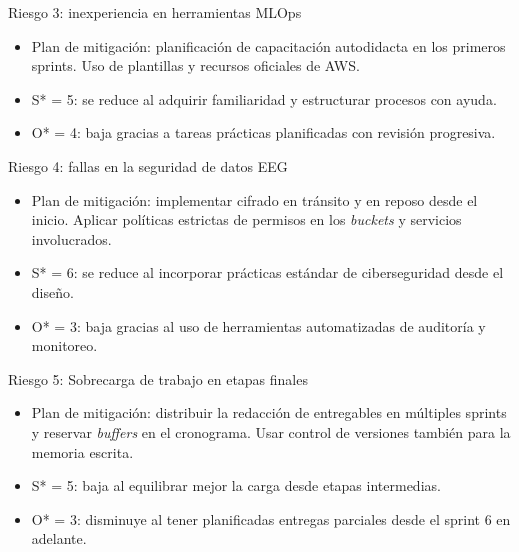 \documentclass[
11pt, %
]{charter}
\begin{document}
Riesgo 3: inexperiencia en herramientas MLOps
\begin{itemize}
  \item Plan de mitigación: planificación de capacitación autodidacta en los primeros sprints. Uso de plantillas y recursos oficiales de AWS.
  \item S* = 5: se reduce al adquirir familiaridad y estructurar procesos con ayuda.
  \item O* = 4:  baja gracias a tareas prácticas planificadas con revisión progresiva.
\end{itemize}

Riesgo 4: fallas en la seguridad de datos EEG
\begin{itemize}
  \item Plan de mitigación: implementar cifrado en tránsito y en reposo desde el inicio. Aplicar políticas estrictas de permisos en los \textit{buckets} y servicios involucrados.
  \item S* = 6: se reduce al incorporar prácticas estándar de ciberseguridad desde el diseño.
  \item O* = 3: baja gracias al uso de herramientas automatizadas de auditoría y monitoreo.
\end{itemize}

Riesgo 5: Sobrecarga de trabajo en etapas finales
\begin{itemize}
  \item Plan de mitigación: distribuir la redacción de entregables en múltiples sprints y reservar \textit{buffers} en el cronograma. Usar control de versiones también para la memoria escrita.
  \item S* = 5: baja al equilibrar mejor la carga desde etapas intermedias.
  \item O* = 3: disminuye al tener planificadas entregas parciales desde el sprint 6 en adelante.
\end{itemize}
\vspace{6.3cm}
\end{document}
